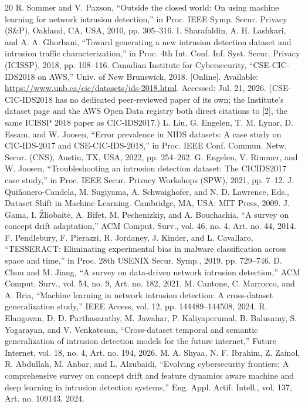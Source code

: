 \documentclass[conference]{IEEEtran}
\begin{document}
\begin{thebibliography}{20}
 R. Sommer and V. Paxson, ``Outside the closed world: On using machine learning for network intrusion detection,'' in Proc. IEEE Symp. Secur. Privacy (S\&P), Oakland, CA, USA, 2010, pp. 305--316.
 I. Sharafaldin, A. H. Lashkari, and A. A. Ghorbani, ``Toward generating a new intrusion detection dataset and intrusion traffic characterization,'' in Proc. 4th Int. Conf. Inf. Syst. Secur. Privacy (ICISSP), 2018, pp. 108--116.
 Canadian Institute for Cybersecurity, ``CSE-CIC-IDS2018 on AWS,'' Univ. of New Brunswick, 2018. [Online]. Available: \url{https://www.unb.ca/cic/datasets/ids-2018.html}. Accessed: Jul. 21, 2026. (CSE-CIC-IDS2018 has no dedicated peer-reviewed paper of its own; the Institute's dataset page and the AWS Open Data registry both direct citations to [2], the same ICISSP 2018 paper as CIC-IDS2017.)
 L. Liu, G. Engelen, T. M. Lynar, D. Essam, and W. Joosen, ``Error prevalence in NIDS datasets: A case study on CIC-IDS-2017 and CSE-CIC-IDS-2018,'' in Proc. IEEE Conf. Commun. Netw. Secur. (CNS), Austin, TX, USA, 2022, pp. 254--262.
 G. Engelen, V. Rimmer, and W. Joosen, ``Troubleshooting an intrusion detection dataset: The CICIDS2017 case study,'' in Proc. IEEE Secur. Privacy Workshops (SPW), 2021, pp. 7--12.
 J. Quiñonero-Candela, M. Sugiyama, A. Schwaighofer, and N. D. Lawrence, Eds., Dataset Shift in Machine Learning. Cambridge, MA, USA: MIT Press, 2009.
 J. Gama, I. Žliobaitė, A. Bifet, M. Pechenizkiy, and A. Bouchachia, ``A survey on concept drift adaptation,'' ACM Comput. Surv., vol. 46, no. 4, Art. no. 44, 2014.
 F. Pendlebury, F. Pierazzi, R. Jordaney, J. Kinder, and L. Cavallaro, ``TESSERACT: Eliminating experimental bias in malware classification across space and time,'' in Proc. 28th USENIX Secur. Symp., 2019, pp. 729--746.
 D. Chou and M. Jiang, ``A survey on data-driven network intrusion detection,'' ACM Comput. Surv., vol. 54, no. 9, Art. no. 182, 2021.
 M. Cantone, C. Marrocco, and A. Bria, ``Machine learning in network intrusion detection: A cross-dataset generalization study,'' IEEE Access, vol. 12, pp. 144489--144508, 2024.
 R. Elangovan, D. D. Parthasarathy, M. Jawahar, P. Kaliyaperumal, B. Balusamy, S. Yogarayan, and V. Venkatesan, ``Cross-dataset temporal and semantic generalization of intrusion detection models for the future internet,'' Future Internet, vol. 18, no. 4, Art. no. 194, 2026.
 M. A. Shyaa, N. F. Ibrahim, Z. Zainol, R. Abdullah, M. Anbar, and L. Alzubaidi, ``Evolving cybersecurity frontiers: A comprehensive survey on concept drift and feature dynamics aware machine and deep learning in intrusion detection systems,'' Eng. Appl. Artif. Intell., vol. 137, Art. no. 109143, 2024.

\end{thebibliography}
\end{document}
